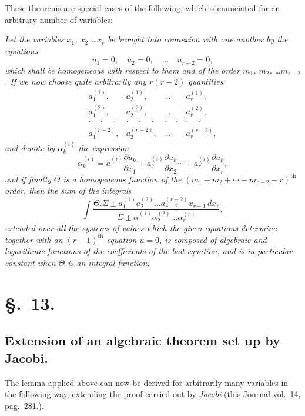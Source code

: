 \documentclass{article}
\begin{document}

These theorems are special cases of the following, which is enunciated for an arbitrary number of variables:

\emph{Let the variables $x_{1}$, $x_{2}$ \ldots $x_{r}$ be brought into connexion with one another by the equations}
\[
u_{1}=0, \quad u_{2}=0, \quad \ldots \quad u_{r-2}=0,
\]
\emph{which shall be homogeneous with respect to them and of the order $m_{1}$, $m_{2}$, \ldots $m_{r-2}$. If we now choose quite arbitrarily any $r(r-2)$ quantities}
\[
\begin{matrix}
a_{1}^{(1)}, & a_{2}^{(1)}, & \ldots & a_{r}^{(1)},\\
a_{1}^{(2)}, & a_{2}^{(2)}, & \ldots & a_{r}^{(2)},\\
\cdot\quad\cdot\quad\cdot & \cdot\quad\cdot\quad\cdot & \cdot\quad\cdot & \cdot\quad\cdot\\
a_{1}^{(r-2)}, & a_{2}^{(r-2)}, & \ldots & a_{r}^{(r-2)},
\end{matrix}
\]
\emph{and denote by $\alpha_{k}^{(i)}$ the expression}
\[
\alpha_{k}^{(i)} = a_{1}^{(i)}\frac{\partial u_{k}}{\partial x_{1}} + a_{2}^{(i)}\frac{\partial u_{k}}{\partial x_{2}}\cdots + a_{r}^{(i)}\frac{\partial u_{k}}{\partial x_{r}},
\]
\emph{and if finally $\Theta$ is a homogeneous function of the $(m_{1}+m_{2}+\cdots+m_{r-2}-r)^{\text{th}}$ order, then the sum of the integrals}
\[
\int \frac{\Theta.\Sigma\pm a_{1}^{(1)}a_{2}^{(2)}\ldots a_{r-2}^{(r-2)}x_{r-1}\,dx_{r}}{\Sigma\pm\alpha_{1}^{(1)}\alpha_{2}^{(2)}\ldots\alpha_{r}^{(r)}},
\]
\emph{extended over all the systems of values which the given equations determine together with an $(r-1)^{\text{th}}$ equation $u=0$, is composed of algebraic and logarithmic functions of the coefficients of the last equation, and is in particular constant when $\Theta$ is an integral function.}

\section*{§.~13.}

\subsection*{Extension of an algebraic theorem set up by Jacobi.}

The lemma applied above can now be derived for arbitrarily many variables in the following way, extending the proof carried out by \emph{Jacobi} (this Journal vol.\ 14, pag.\ 281.).
\end{document}
